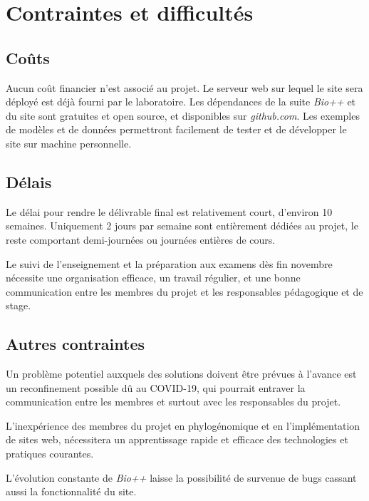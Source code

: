 \section{Contraintes et difficultés}

\subsection{Coûts}

Aucun coût financier n'est associé au projet.
Le serveur web sur lequel le site sera déployé est déjà fourni par le laboratoire.
Les dépendances de la suite \textit{Bio++} et du site sont gratuites et open source,
et disponibles sur \textit{github.com}.
Les exemples de modèles et de données permettront facilement
de tester et de développer le site sur machine personnelle.


\subsection{Délais}

Le délai pour rendre le délivrable final est relativement court,
d'environ 10 semaines.
Uniquement 2 jours par semaine sont entièrement dédiées au projet,
le reste comportant demi-journées ou journées entières de cours.

Le suivi de l'enseignement et la préparation
aux examens dès fin novembre
nécessite une organisation efficace,
un travail régulier,
et une bonne communication entre les membres du projet
et les responsables pédagogique et de stage.


\subsection{Autres contraintes}

Un problème potentiel auxquels des solutions doivent être prévues à l'avance
est un reconfinement possible dû au COVID-19,
qui pourrait entraver la communication entre les membres
et surtout avec les responsables du projet.

L'inexpérience des membres du projet en phylogénomique
et en l'implémentation de sites web,
nécessitera un apprentissage rapide et efficace
des technologies et pratiques courantes.

L'évolution constante de \textit{Bio++}
laisse la possibilité de survenue de bugs
cassant aussi la fonctionnalité du site.
